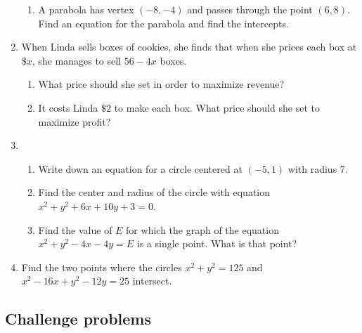 \begin{enumerate}
\begin{enumerate}
\item A parabola has vertex $(-8,-4)$ and passes through the point $(6,8)$. Find an equation for the parabola and find the intercepts.
\end{enumerate}
\item When Linda sells boxes of cookies, she finds that when she prices each box at $\$x$, she manages to sell $56 - 4x$ boxes.
\begin{enumerate}
\item What price should she set in order to maximize revenue?
\item It costs Linda $\$2$ to make each box. What price should she set to maximize profit?
\end{enumerate}
\item \begin{enumerate}
\item Write down an equation for a circle centered at $(-5, 1)$ with radius $7$.
\item Find the center and radius of the circle with equation $x^2 + y^2 + 6x + 10y + 3 = 0$.
\item Find the value of $E$ for which the graph of the equation $x^2 + y^2 - 4x - 4y = E$ is a single point. What is that point?
\end{enumerate}
\item Find the two points where the circles $x^2 + y^2 = 125$ and $x^2 - 16x + y^2 - 12y = 25$ intersect.
\end{enumerate}


\subsection{Challenge problems}

